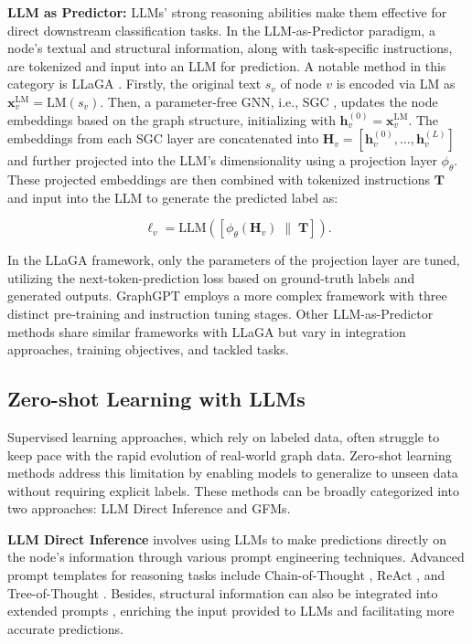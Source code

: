 \textbf{LLM as Predictor: }LLMs' strong reasoning abilities make them effective for direct downstream classification tasks. In the LLM-as-Predictor paradigm, a node's textual and structural information, along with task-specific instructions, are tokenized and input into an LLM for prediction. A notable method in this category is LLaGA \cite{chen23llaga}. Firstly, the original text $s_v$ of node $v$ is encoded via LM as $\bm{x}_v^{\text{LM}} = \text{LM}(s_v)$. Then, a parameter-free GNN, i.e., SGC \cite{Wu2019SimplifyingGC}, updates the node embeddings based on the graph structure, initializing with $\bm{h}_v^{(0)} = \bm{x}_v^{\text{LM}}$. The embeddings from each SGC layer are concatenated into $\bm{H}_v = [ \bm{h}_v^{(0)}, \ldots, \bm{h}_v^{(L)} ] $ and further projected into the LLM's dimensionality using a projection layer $\phi_{\theta}$. These projected embeddings are then combined with tokenized instructions $\bm{T}$ and input into the LLM to generate the predicted label as:

\begin{equation*}
    \ell_v = \text{LLM}( [  \phi_{\theta}(\bm{H}_v ) \; \| \;  \bm{T}  ] ).
\end{equation*}

In the LLaGA framework, only the parameters of the projection layer are tuned, utilizing the next-token-prediction loss based on ground-truth labels and generated outputs. GraphGPT employs a more complex framework with three distinct pre-training and instruction tuning stages. Other LLM-as-Predictor methods \cite{chai2023graphllm, perozzi2024graphtoken, Kong2024GOFAAG, Huang2024GraphAdapter, Zhao2023GraphTextGR, Ji2024NTLLMAN} share similar frameworks with LLaGA but vary in integration approaches, training objectives, and tackled tasks.


\subsection{Zero-shot Learning with LLMs}
Supervised learning approaches, which rely on labeled data, often struggle to keep pace with the rapid evolution of real-world graph data. Zero-shot learning methods address this limitation by enabling models to generalize to unseen data without requiring explicit labels. These methods can be broadly categorized into two approaches: LLM Direct Inference and GFMs.

\textbf{LLM Direct Inference} involves using LLMs to make predictions directly on the node's information through various prompt engineering techniques. Advanced prompt templates for reasoning tasks include Chain-of-Thought \cite{Wei2022ChainOT}, ReAct \cite{Yao2022ReActSR}, and Tree-of-Thought \cite{yao2023tree}. Besides, structural information can also be integrated into extended prompts \cite{tang2023graphgpt, wang2023can, Huang2023CanLE}, enriching the input provided to LLMs and facilitating more accurate predictions.

